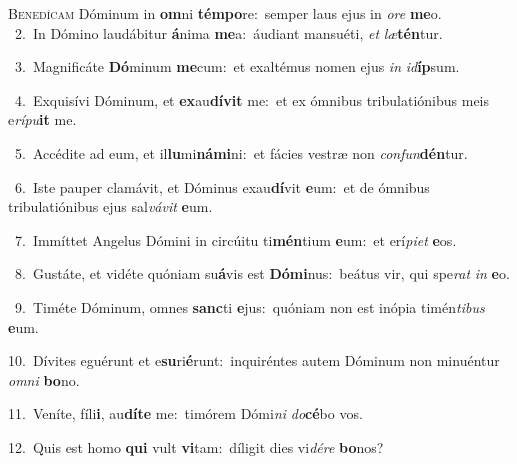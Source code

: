 \lettrine{\initial\textcolor{\initialcolor}{B}}{enedícam} Dóminum in \textbf{om}\-ni \textbf{tém}\-\textbf{po}re:~\star semper laus ejus in \textit{o}\-\textit{re} \textbf{me}\-o.\\
{\numbfont\textcolor{\numbcolor}{~2.}}~In Dómino laudábitur \textbf{á}\-nima \textbf{me}\-a:~\star áudiant mansuéti, \textit{et} \textit{læ}\-\textbf{tén}tur.\par
{\numbfont\textcolor{\numbcolor}{~3.}}~Magnificáte \textbf{Dó}\-minum \textbf{me}\-cum:~\star et exaltémus nomen ejus \textit{in} \textit{id}\-\textbf{íp}sum.\par
{\numbfont\textcolor{\numbcolor}{~4.}}~Exquisívi Dóminum, et \textbf{ex}\-au\-\textbf{dí}\-\textbf{vit} me:~\star et ex ómnibus tribulatiónibus meis e\-\textit{rí}\-\textit{pu}\textbf{it} me.\par
{\numbfont\textcolor{\numbcolor}{~5.}}~Accédite ad eum, et il\-\textbf{lu}\-mi\-\textbf{ná}\-\textbf{mi}ni:~\star et fácies vestræ non \textit{con}\-\textit{fun}\textbf{dén}tur.\par
{\numbfont\textcolor{\numbcolor}{~6.}}~Iste pauper clamávit, et Dóminus exau\-\textbf{dí}\-vit \textbf{e}\-um:~\star et de ómnibus tribulatiónibus ejus sal\-\textit{vá}\-\textit{vit} \textbf{e}\-um.\par
{\numbfont\textcolor{\numbcolor}{~7.}}~Immíttet Angelus Dómini in circúitu ti\-\textbf{mén}\-tium \textbf{e}\-um:~\star et erí\-\textit{pi}\-\textit{et} \textbf{e}\-os.\par
{\numbfont\textcolor{\numbcolor}{~8.}}~Gustáte, et vidéte quóniam su\-\textbf{á}\-vis est \textbf{Dó}\-\textbf{mi}nus:~\star beátus vir, qui spe\textit{rat} \textit{in} \textbf{e}\-o.\par
{\numbfont\textcolor{\numbcolor}{~9.}}~Timéte Dóminum, omnes \textbf{sanc}\-ti \textbf{e}\-jus:~\star quóniam non est inópia timén\-\textit{ti}\-\textit{bus} \textbf{e}\-um.\par
{\numbfont\textcolor{\numbcolor}{10.}}~Dívites eguérunt et e\-\textbf{su}\-ri\-\textbf{é}\-runt:~\star inquiréntes autem Dóminum non minuéntur \textit{om}\-\textit{ni} \textbf{bo}\-no.\par
{\numbfont\textcolor{\numbcolor}{11.}}~Veníte, fíli\-\textbf{i}\-, au\-\textbf{dí}\-\textbf{te} me:~\star timórem Dómi\textit{ni} \textit{do}\-\textbf{cé}bo vos.\par
{\numbfont\textcolor{\numbcolor}{12.}}~Quis est homo \textbf{qui} vult \textbf{vi}\-tam:~\star díligit dies vi\-\textit{dé}\-\textit{re} \textbf{bo}\-nos?\par
